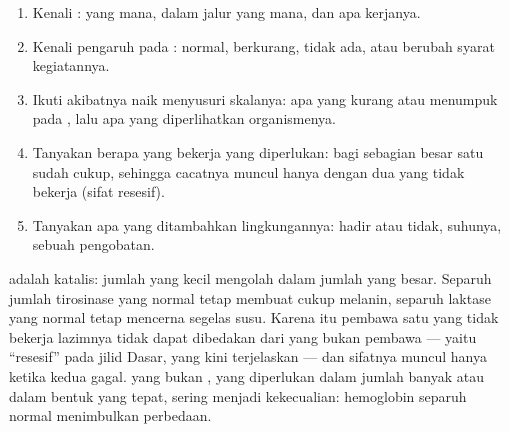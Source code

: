 \begin{method}\label{met:g11:enzymes-and-phenotype:reason}
\begin{enumerate}
  \item Kenali :  yang mana, dalam jalur yang mana, dan
        apa kerjanya.
  \item Kenali pengaruh  pada : normal, berkurang,
        tidak ada, atau berubah syarat kegiatannya.
  \item Ikuti akibatnya naik menyusuri skalanya: apa yang kurang atau
        menumpuk pada , lalu apa yang diperlihatkan organismenya.
  \item Tanyakan berapa  yang bekerja yang diperlukan: bagi
        sebagian besar  satu sudah cukup, sehingga cacatnya muncul
        hanya dengan dua  yang tidak bekerja (sifat resesif).
  \item Tanyakan apa yang ditambahkan lingkungannya:  hadir
        atau tidak, suhunya, sebuah pengobatan.
\end{enumerate}
\end{method}

\begin{remark}\label{rem:g11:enzymes-and-phenotype:recessive}
 adalah katalis: jumlah yang kecil mengolah  dalam jumlah
yang besar. Separuh jumlah tirosinase yang normal tetap membuat cukup
melanin, separuh laktase yang normal tetap mencerna segelas susu.
Karena itu pembawa satu  yang tidak bekerja lazimnya tidak dapat
dibedakan dari yang bukan pembawa --- yaitu ``resesif'' pada jilid
Dasar, yang kini terjelaskan --- dan sifatnya muncul hanya ketika kedua
 gagal.  yang bukan , yang diperlukan dalam jumlah
banyak atau dalam bentuk yang tepat, sering menjadi kekecualian:
hemoglobin separuh normal menimbulkan perbedaan.
\end{remark}

